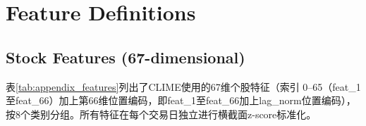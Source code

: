 \appendix

\section{Feature Definitions}
\label{sec:appendix_features}

\subsection{Stock Features (67-dimensional)}

表\ref{tab:appendix_features}列出了CLIME使用的67维个股特征（索引 0--65（feat\_1至feat\_66）加上第66维位置编码，即feat\_1至feat\_66加上lag\_norm位置编码），按8个类别分组。所有特征在每个交易日独立进行横截面z-score标准化。

